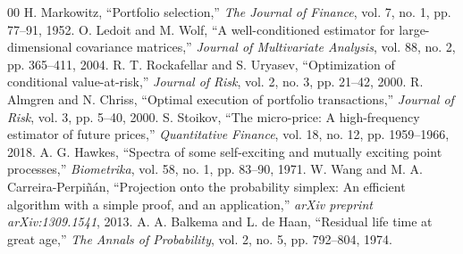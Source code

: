 \documentclass[10pt,journal,compsoc]{IEEEtran}
\begin{document}
\begin{thebibliography}{00}
 H. Markowitz, ``Portfolio selection,'' \emph{The Journal of Finance}, vol. 7, no. 1, pp. 77--91, 1952.
 O. Ledoit and M. Wolf, ``A well-conditioned estimator for large-dimensional covariance matrices,'' \emph{Journal of Multivariate Analysis}, vol. 88, no. 2, pp. 365--411, 2004.
 R. T. Rockafellar and S. Uryasev, ``Optimization of conditional value-at-risk,'' \emph{Journal of Risk}, vol. 2, no. 3, pp. 21--42, 2000.
 R. Almgren and N. Chriss, ``Optimal execution of portfolio transactions,'' \emph{Journal of Risk}, vol. 3, pp. 5--40, 2000.
 S. Stoikov, ``The micro-price: A high-frequency estimator of future prices,'' \emph{Quantitative Finance}, vol. 18, no. 12, pp. 1959--1966, 2018.
 A. G. Hawkes, ``Spectra of some self-exciting and mutually exciting point processes,'' \emph{Biometrika}, vol. 58, no. 1, pp. 83--90, 1971.
 W. Wang and M. A. Carreira-Perpi{\~n}{\'a}n, ``Projection onto the probability simplex: An efficient algorithm with a simple proof, and an application,'' \emph{arXiv preprint arXiv:1309.1541}, 2013.
 A. A. Balkema and L. de Haan, ``Residual life time at great age,'' \emph{The Annals of Probability}, vol. 2, no. 5, pp. 792--804, 1974.
\end{thebibliography}
\end{document}
